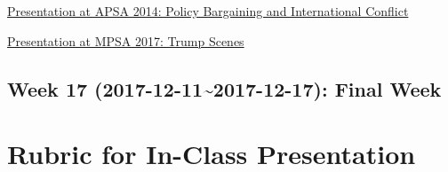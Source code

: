 \documentclass[11pt,]{article}
\theoremstyle{definition}
\theoremstyle{definition}
\theoremstyle{remark}
\begin{document}
\href{https://www.youtube.com/watch?v=bwNBXuz2eRg}{Presentation at APSA
2014: Policy Bargaining and International Conflict}

\href{https://www.youtube.com/watch?v=Z4ISkF2H4tk}{Presentation at MPSA
2017: Trump Scenes}

\subsection{Week 17 (2017-12-11\textasciitilde{}2017-12-17): Final
Week}\label{week-17-2017-12-112017-12-17-final-week}

\section{Rubric for In-Class
Presentation}\label{rubric-for-in-class-presentation}
\end{document}
